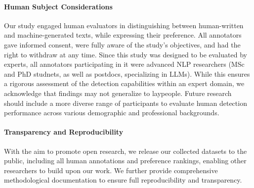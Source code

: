 \paragraph{Human Subject Considerations}
Our study engaged human evaluators in distinguishing between human-written and machine-generated texts, while expressing their preference. All annotators gave informed consent, were fully aware of the study's objectives, and had the right to withdraw at any time. Since this study was designed to be evaluated by experts, all annotators participating in it were advanced NLP researchers (MSc and PhD studnets, as well as postdocs, specializing in LLMs). While this ensures a rigorous assessment of the detection capabilities within an expert domain, we acknowledge that findings may not generalize to laypeople. Future research should include a more diverse range of participants to evaluate human detection performance across various demographic and professional backgrounds.

\paragraph{Transparency and Reproducibility}
With the aim to promote open research, we release our collected datasets to the public, including all human annotations and preference rankings, enabling other researchers to build upon our work. We further provide comprehensive methodological documentation to ensure full reproducibility and transparency.